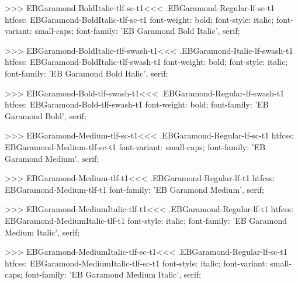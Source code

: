 {{{{{{{>>>
\<EBGaramond-BoldItalic-tlf-sc-t1\><<<
.EBGaramond-Regular-lf-sc-t1
htfcss:  EBGaramond-BoldItalic-tlf-sc-t1  font-weight: bold; font-style: italic; font-variant: small-caps; font-family: 'EB Garamond Bold Italic', serif;

>>>
\<EBGaramond-BoldItalic-tlf-swash-t1\><<<
.EBGaramond-Italic-lf-swash-t1
htfcss:  EBGaramond-BoldItalic-tlf-swash-t1  font-weight: bold; font-style: italic; font-family: 'EB Garamond Bold Italic', serif;

>>>
\<EBGaramond-Bold-tlf-swash-t1\><<<
.EBGaramond-Regular-lf-swash-t1
htfcss:  EBGaramond-Bold-tlf-swash-t1  font-weight: bold; font-family: 'EB Garamond Bold', serif;

>>>
\<EBGaramond-Medium-tlf-sc-t1\><<<
.EBGaramond-Regular-lf-sc-t1
htfcss:  EBGaramond-Medium-tlf-sc-t1  font-variant: small-caps; font-family: 'EB Garamond Medium', serif;

>>>
\<EBGaramond-Medium-tlf-t1\><<<
.EBGaramond-Regular-lf-t1
htfcss:  EBGaramond-Medium-tlf-t1  font-family: 'EB Garamond Medium', serif;

>>>
\<EBGaramond-MediumItalic-tlf-t1\><<<
.EBGaramond-Regular-lf-t1
htfcss:  EBGaramond-MediumItalic-tlf-t1  font-style: italic; font-family: 'EB Garamond Medium Italic', serif;

>>>
\<EBGaramond-MediumItalic-tlf-sc-t1\><<<
.EBGaramond-Regular-lf-sc-t1
htfcss:  EBGaramond-MediumItalic-tlf-sc-t1  font-style: italic; font-variant: small-caps; font-family: 'EB Garamond Medium Italic', serif;

}}}}}}}
